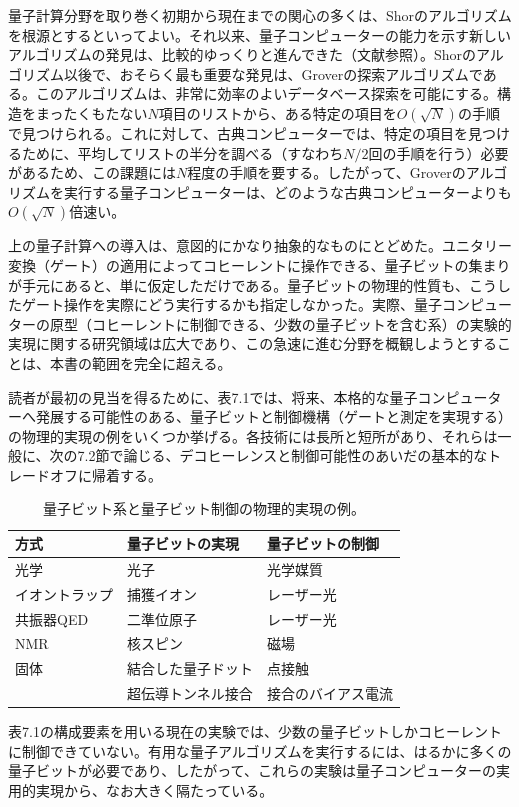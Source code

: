 量子計算分野を取り巻く初期から現在までの関心の多くは、Shorのアルゴリズムを根源とするといってよい。それ以来、量子コンピューターの能力を示す新しいアルゴリズムの発見は、比較的ゆっくりと進んできた（文献\cite{ref339,ref342}参照）。Shorのアルゴリズム以後で、おそらく最も重要な発見は、Groverの探索アルゴリズムである\cite{ref346,ref347}。このアルゴリズムは、非常に効率のよいデータベース探索を可能にする。構造をまったくもたない$N$項目のリストから、ある特定の項目を$O(\sqrt N)$の手順で見つけられる。これに対して、古典コンピューターでは、特定の項目を見つけるために、平均してリストの半分を調べる（すなわち$N/2$回の手順を行う）必要があるため、この課題には$N$程度の手順を要する。したがって、Groverのアルゴリズムを実行する量子コンピューターは、どのような古典コンピューターよりも$O(\sqrt N)$倍速い。

上の量子計算への導入は、意図的にかなり抽象的なものにとどめた。ユニタリー変換（ゲート）の適用によってコヒーレントに操作できる、量子ビットの集まりが手元にあると、単に仮定しただけである。量子ビットの物理的性質も、こうしたゲート操作を実際にどう実行するかも指定しなかった。実際、量子コンピューターの原型（コヒーレントに制御できる、少数の量子ビットを含む系）の実験的実現に関する研究領域は広大であり、この急速に進む分野を概観しようとすることは、本書の範囲を完全に超える。

読者が最初の見当を得るために、表7.1では、将来、本格的な量子コンピューターへ発展する可能性のある、量子ビットと制御機構（ゲートと測定を実現する）の物理的実現の例をいくつか挙げる。各技術には長所と短所があり、それらは一般に、次の7.2節で論じる、デコヒーレンスと制御可能性のあいだの基本的なトレードオフに帰着する。
\hypertarget{srcpage:301}{}\label{srcpage:301}
\begin{table}[htbp]\centering\small
\caption{量子ビット系と量子ビット制御の物理的実現の例。}
\begin{tabular}{lll}\hline
方式&量子ビットの実現&量子ビットの制御\\\hline
光学&光子&光学媒質\\
イオントラップ&捕獲イオン&レーザー光\\
共振器QED&二準位原子&レーザー光\\
NMR&核スピン&磁場\\
固体&結合した量子ドット&点接触\\
&超伝導トンネル接合&接合のバイアス電流\\\hline
\end{tabular}\end{table}
表7.1の構成要素を用いる現在の実験では、少数の量子ビットしかコヒーレントに制御できていない。有用な量子アルゴリズムを実行するには、はるかに多くの量子ビットが必要であり、したがって、これらの実験は量子コンピューターの実用的実現から、なお大きく隔たっている。
